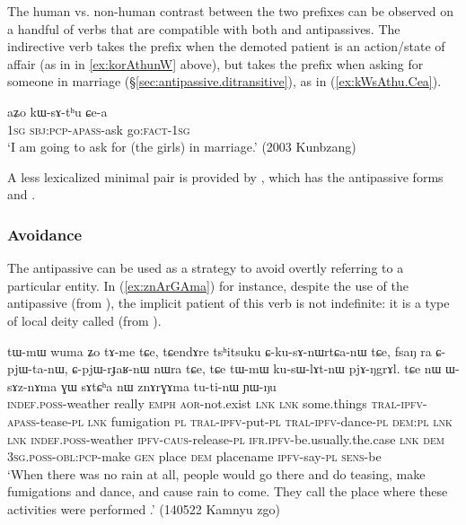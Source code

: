 The human vs. non-human contrast between the two prefixes can be observed on a handful of verbs that are compatible with both  and  antipassives. The indirective verb  takes the  prefix when the demoted patient is an action/state of affair (as in  in \ref{ex:korAthunW} above), but takes the  prefix when asking for someone in marriage (§\ref{sec:antipassive.ditransitive}), as in (\ref{ex:kWsAthu.Cea}).
 
\begin{exe}
\ex \label{ex:kWsAthu.Cea}
\gll  aʑo kɯ-sɤ-tʰu ɕe-a \\
\textsc{1sg} \textsc{sbj}:\textsc{pcp}-\textsc{apass}-ask go:\textsc{fact}-\textsc{1sg} \\
\glt `I am going to ask for (the girls) in marriage.' (2003 Kunbzang)
\end{exe}

A less lexicalized minimal pair is provided by , which has the antipassive forms  and .

\subsubsection{Avoidance} \label{sec:antipassive.avoidance}
The  antipassive can be used as a strategy to avoid overtly referring to a particular entity. In (\ref{ex:znArGAma}) for instance, despite the use of the antipassive  (from ), the implicit patient of this verb is not indefinite: it is a type of local deity called   (from ).
\largerpage
\begin{exe}
\ex \label{ex:znArGAma}
\gll tɯ-mɯ wuma ʑo tɤ-me tɕe, tɕendɤre tsʰitsuku ɕ-ku-sɤ-nɯrtɕa-nɯ tɕe, fsaŋ ra ɕ-pjɯ-ta-nɯ, ɕ-pjɯ-rɟaʁ-nɯ nɯra tɕe, tɕe tɯ-mɯ ku-sɯ-lɤt-nɯ pjɤ-ŋgrɤl. tɕe nɯ ɯ-sɤz-nɤma ɣɯ sɤtɕʰa nɯ znɤrɣɤma tu-ti-nɯ ɲɯ-ŋu \\
\textsc{indef}.\textsc{poss}-weather really \textsc{emph} \textsc{aor}-not.exist \textsc{lnk} \textsc{lnk} some.things \textsc{tral}-\textsc{ipfv}-\textsc{apass}-tease-\textsc{pl} \textsc{lnk} fumigation \textsc{pl} \textsc{tral}-\textsc{ipfv}-put-\textsc{pl} \textsc{tral}-\textsc{ipfv}-dance-\textsc{pl} \textsc{dem}:\textsc{pl} \textsc{lnk} \textsc{lnk} \textsc{indef}.\textsc{poss}-weather \textsc{ipfv}-\textsc{caus}-release-\textsc{pl} \textsc{ifr}.\textsc{ipfv}-be.usually.the.case \textsc{lnk} \textsc{dem} \textsc{3sg}.\textsc{poss}-\textsc{obl}:\textsc{pcp}-make \textsc{gen} place \textsc{dem} placename \textsc{ipfv}-say-\textsc{pl} \textsc{sens}-be \\
\glt `When there was no rain at all, people would go there and do teasing, make fumigations and dance, and cause rain to come. They call the place where these activities were performed .' (140522 Kamnyu zgo) 	
\end{exe}

